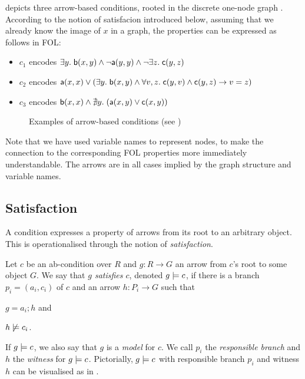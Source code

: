\begin{example}
 depicts three arrow-based conditions, rooted in the discrete one-node graph . According
to the notion of satisfacion introduced below, assuming that we already know the image of $x$ in a graph, the properties can be expressed as follows in FOL:
\begin{itemize}
\item $c_1$ encodes $\exists y.\; \mathsf{b}(x,y) \wedge \neg \mathsf{a}(y,y)\wedge \neg \exists z.\; \mathsf{c}(y,z)$ 
\item $c_2$ encodes $\mathsf{a}(x,x)\vee (\exists y.\; \mathsf{b}(x,y) \wedge \forall v,z.\; \mathsf{c}(y,v)\wedge \mathsf{c}(y,z) \rightarrow v=z)$
\item $c_3$ encodes $\mathsf{b}(x,x)\wedge \nexists y.\;(\mathsf{a}(x,y)\vee \mathsf{c}(x,y))$
\end{itemize}
\begin{figure}[t]
\begin{center}

\end{center}
\caption{Examples of arrow-based conditions (see )}
\end{figure}
Note that we have used variable names to represent nodes, to make the connection to the corresponding FOL properties more immediately understandable. The arrows are in all cases implied by the graph structure and variable names.
\end{example}

\subsection{Satisfaction}

A condition expresses a property of arrows from its root to an arbitrary object. This is operationalised through the notion of \emph{satisfaction}.

\begin{definition}
  Let $c$ be an ab-condition over $R$ and $g:R\to G$ an arrow from $c$'s root to some object $G$. We say that \emph{$g$ satisfies $c$}, denoted $g\models c$, if there is a branch $p_i=(a_i,c_i)$ of $c$ and an arrow $h:P_i\to G$ such that
  \begin{enumerate*}
  \item $g=a_i;h$ and
  \item $h\not\models c_i$.
  \end{enumerate*}
\end{definition}
%
If $g\models c$, we also say that $g$ is a \emph{model} for $c$. We call $p_i$ the \emph{responsible branch} and $h$ the \emph{witness} for $g\models c$. Pictorially, $g\models c$ with responsible branch $p_i$ and witness $h$ can be visualised as in .

